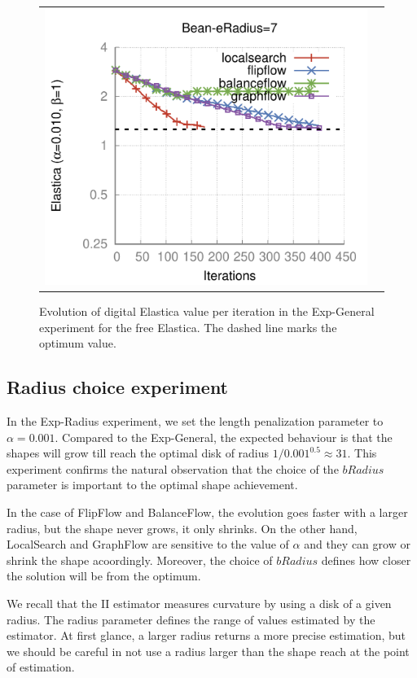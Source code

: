 \begin{figure}
\begin{tabular}{cc}
\includegraphics[scale=0.45]{figures/chapter9/free-elastica/plots/iteration/main_experiment/len_pen_0.01/radius-7/bean.pdf}
\end{tabular}
\caption{Evolution of digital Elastica value per iteration in the Exp-General experiment for the free Elastica. The dashed line marks the optimum value.}
\label{ch9:fig:plots-free-elastica-general}
\end{figure}

\subsection{Radius choice experiment}

In the Exp-Radius experiment, we set the length penalization parameter to $\alpha=0.001$. Compared to the Exp-General, the expected behaviour is that the shapes will grow till reach the optimal disk of radius $1/0.001^{0.5} \approx 31$. This experiment confirms the natural observation that the choice of the $bRadius$ parameter is important to the optimal shape achievement.

In the case of FlipFlow and BalanceFlow, the evolution goes faster with a larger radius, but the shape never grows, it only shrinks. On the other hand, LocalSearch and GraphFlow are sensitive to the value of $\alpha$ and they can grow or shrink the shape acoordingly. Moreover, the choice of $bRadius$ defines how closer the solution will be from the optimum.

We recall that the II estimator measures curvature by using a disk of a given radius. The radius parameter defines the range of values estimated by the estimator. At first glance, a larger radius returns a more precise estimation, but we should be careful in not use a radius larger than the shape reach at the point of estimation.

